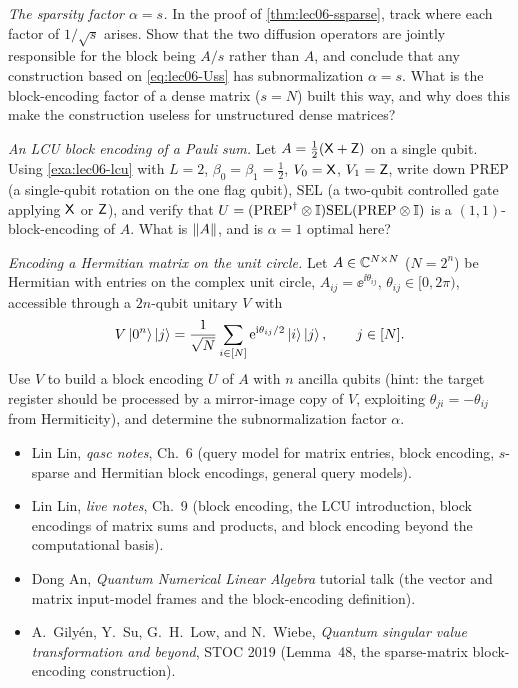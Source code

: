 \begin{exercise}\label{ex:lec06-5}
\emph{The sparsity factor $\alpha=s$.} In the proof of \cref{thm:lec06-ssparse}, track
where each factor of $1/\sqrt s$ arises. Show that the two diffusion operators are
jointly responsible for the block being $A/s$ rather than $A$, and conclude that any
construction based on \eqref{eq:lec06-Uss} has subnormalization $\alpha=s$. What is the
block-encoding factor of a dense matrix ($s=N$) built this way, and why does this make
the construction useless for unstructured dense matrices?
\end{exercise}

\begin{exercise}\label{ex:lec06-6}
\emph{An LCU block encoding of a Pauli sum.} Let $A=\tfrac12(\mathsf{X}+\mathsf{Z})$ on a
single qubit. Using \cref{exa:lec06-lcu} with $L=2$, $\beta_0=\beta_1=\tfrac12$,
$V_0=\mathsf{X}$, $V_1=\mathsf{Z}$, write down $\mathrm{PREP}$ (a single-qubit rotation on the
one flag qubit), $\mathrm{SEL}$ (a two-qubit controlled gate applying $\mathsf{X}$ or
$\mathsf{Z}$), and verify that
$U=(\mathrm{PREP}^{\dagger}\otimes\mathbb{I})\mathrm{SEL}(\mathrm{PREP}\otimes\mathbb{I})$ is a
$(1,1)$-block-encoding of $A$. What is $\left\lVert A \right\rVert$, and is $\alpha=1$ optimal here?
\end{exercise}

\begin{exercise}\label{ex:lec06-7}
\emph{Encoding a Hermitian matrix on the unit circle.} Let $A\in\mathbb{C}^{N\times N}$
($N=2^n$) be Hermitian with entries on the complex unit circle,
$A_{ij}=\ee^{\ii\theta_{ij}}$, $\theta_{ij}\in[0,2\pi)$, accessible through a
$2n$-qubit unitary $V$ with
\[
  V\ket{0^n}\ket{j}=\frac{1}{\sqrt N}\sum_{i\in[N]}\mathrm{e}^{\mathrm{i}\theta_{ij}/2}\ket{i}\ket{j},
  \qquad j\in[N].
\]
Use $V$ to build a block encoding $U$ of $A$ with $n$ ancilla qubits (hint: the
target register should be processed by a mirror-image copy of $V$, exploiting
$\theta_{ji}=-\theta_{ij}$ from Hermiticity), and determine the subnormalization
factor $\alpha$.
\end{exercise}

\readingsection
\begin{itemize}[leftmargin=1.4em]
  \item Lin Lin, \emph{qasc notes}, Ch.~6 (query model for matrix entries, block
        encoding, $s$-sparse and Hermitian block encodings, general query models).
  \item Lin Lin, \emph{live notes}, Ch.~9 (block encoding, the LCU introduction,
        block encodings of matrix sums and products, and block encoding beyond the
        computational basis).
  \item Dong An, \emph{Quantum Numerical Linear Algebra} tutorial talk (the vector
        and matrix input-model frames and the block-encoding definition).
  \item A.~Gily\'en, Y.~Su, G.~H.~Low, and N.~Wiebe, \emph{Quantum singular value
        transformation and beyond}, STOC 2019 (Lemma~48, the sparse-matrix
        block-encoding construction).
\end{itemize}
